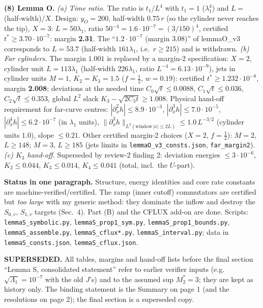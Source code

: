 \documentclass[11pt]{article}
\begin{document}
\textbf{(8) Lemma O.} \emph{(a) Time ratio.} The ratio is $t_1/L^4$ with $t_1=1$ ($\lambda_1^4$) and $L=$ (half-width)$/X$. Design: $y_O=200$, half-width $0.75\,r$ (so the cylinder never reaches the tip), $X=3$: $L=50\lambda_1$, ratio $50^{-4}=1.6\cdot10^{-7}=(3/150)^4$, certified $t^*\ge3.70\cdot10^{-7}$: margin \textbf{2.31}. The ``$1.2\cdot10^{-7}$ (margin 3.08)'' of lemmaO\_v3 corresponds to $L=53.7$ (half-width $161\lambda_1$, i.e.\ $r\ge215$) and is withdrawn. \emph{(b) Far cylinders.} The margin $1.001$ is replaced by a margin-2 specification: $X=2$, cylinder unit $L=113\lambda_1$ (half-width $226\lambda_1$, ratio $L^{-4}=6.13\cdot10^{-9}$), jets in cylinder units $M=1$, $K_2=K_3=1.5$ ($f=\frac12$, $w=0.19$): certified $t^*\ge1.232\cdot10^{-8}$, margin \textbf{2.008}; deviations at the needed time $C_0\sqrt t\le0.0088$, $C_1\sqrt t\le0.036$, $C_2\sqrt t\le0.353$, global $L^2$ slack $K_3-\sqrt{2C_3t}\ge1.008$. Physical hand-off requirement for far-curve centres: $|\partial_x^2h|\le8.9\cdot10^{-3}$, $|\partial_x^3h|\le7.0\cdot10^{-5}$, $|\partial_x^4h|\le6.2\cdot10^{-7}$ (in $\lambda_1$ units), $\|\partial_x^3h\|_{L^2(\text{window}\,|x|\le2L)}\le1.0\,L^{-3/2}$ (cylinder units $1.0$), slope $\le0.21$. Other certified margin-2 choices ($X=2$, $f=\frac12$): $M=2$, $L\ge148$; $M=3$, $L\ge185$ (jets limits in \texttt{lemmaO\_v3\_consts.json}, \texttt{far\_margin2}). \emph{(c) $K_3$ hand-off.} Superseded by review-2 finding 2: deviation energies $\le3\cdot10^{-6}$, $K_2\le0.044$, $K_3\le0.014$, $K_4\le0.041$ (total, incl.\ the $U$-part).
\normalsize\newpage




\noindent\textbf{Status in one paragraph.} Structure, energy identities and core rate constants are machine-verified/certified. The ramp (inner cutoff) commutators are certified but \emph{too large} with my generic method: they dominate the inflow and destroy the $S_{0,v}$, $S_{1,v}$ targets (Sec.~4). Part (B) and the CFLUX add-on are done. Scripts: \texttt{lemmaS\_symbolic.py}, \texttt{lemmaS\_prop1\_sym.py}, \texttt{lemmaS\_prop1\_bounds.py}, \texttt{lemmaS\_assemble.py}, \texttt{lemmaS\_cflux*.py}, \texttt{lemmaS\_interval.py}; data in \texttt{lemmaS\_consts.json}, \texttt{lemmaS\_cflux.json}.

\noindent\textbf{SUPERSEDED.} All tables, margins and hand-off lists before the final section ``Lemma S, consolidated statement'' refer to earlier verifier inputs (e.g.\ $\sqrt{\Lambda_1}=10^{-7}$ with the old $J$'s) and to the assumed sup $M_2^*=3$; they are kept as history only. The binding statement is the Summary on page 1 (and the resolutions on page 2); the final section is a superseded copy.
\end{document}
